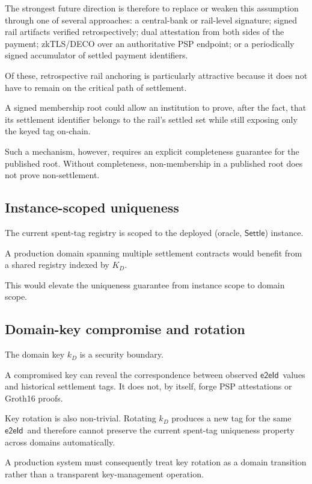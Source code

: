 \documentclass[10pt,twocolumn]{article}
\newcommand{\eeid}{\ensuremath{\mathsf{e2eId}}}
\newcommand{\Settle}{\ensuremath{\mathsf{Settle}}}
\begin{document}
The strongest future direction is therefore to replace or weaken this
assumption through one of several approaches: a central-bank or
rail-level signature; signed rail artifacts verified retrospectively;
dual attestation from both sides of the payment; zkTLS/DECO
\cite{deco} over an authoritative PSP endpoint; or a periodically signed
accumulator of settled payment identifiers.

Of these, retrospective rail anchoring is particularly attractive
because it does not have to remain on the critical path of settlement.

A signed membership root could allow an institution to prove, after the
fact, that its settlement identifier belongs to the rail's settled set
while still exposing only the keyed tag on-chain.

Such a mechanism, however, requires an explicit completeness guarantee
for the published root. Without completeness, non-membership in a
published root does not prove non-settlement.

\subsection{Instance-scoped uniqueness}

The current spent-tag registry is scoped to the deployed (oracle,
\Settle) instance.

A production domain spanning multiple settlement contracts would benefit
from a shared registry indexed by $K_D$.

This would elevate the uniqueness guarantee from instance scope to
domain scope.

\subsection{Domain-key compromise and rotation}

The domain key $k_D$ is a security boundary.

A compromised key can reveal the correspondence between observed \eeid\
values and historical settlement tags. It does not, by itself, forge PSP
attestations or Groth16 proofs.

Key rotation is also non-trivial. Rotating $k_D$ produces a new tag for
the same \eeid\ and therefore cannot preserve the current spent-tag
uniqueness property across domains automatically.

A production system must consequently treat key rotation as a domain
transition rather than a transparent key-management operation.
\end{document}
